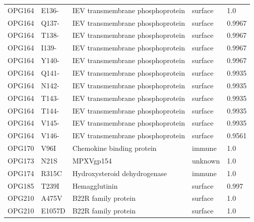 \documentclass[11pt]{article}
\begin{document}
\begin{longtable}{lllll}
OPG164 & E136- & IEV transmembrane phosphoprotein & surface & 1.0 \\
OPG164 & Q137- & IEV transmembrane phosphoprotein & surface & 0.9967 \\
OPG164 & T138- & IEV transmembrane phosphoprotein & surface & 0.9967 \\
OPG164 & I139- & IEV transmembrane phosphoprotein & surface & 0.9967 \\
OPG164 & Y140- & IEV transmembrane phosphoprotein & surface & 0.9967 \\
OPG164 & Q141- & IEV transmembrane phosphoprotein & surface & 0.9935 \\
OPG164 & N142- & IEV transmembrane phosphoprotein & surface & 0.9935 \\
OPG164 & T143- & IEV transmembrane phosphoprotein & surface & 0.9935 \\
OPG164 & T144- & IEV transmembrane phosphoprotein & surface & 0.9935 \\
OPG164 & V145- & IEV transmembrane phosphoprotein & surface & 0.9935 \\
OPG164 & V146- & IEV transmembrane phosphoprotein & surface & 0.9561 \\
OPG170 & V96I & Chemokine binding protein & immune & 1.0 \\
OPG173 & N21S & MPXVgp154 & unknown & 1.0 \\
OPG174 & R315C & Hydroxysteroid dehydrogenase & immune & 1.0 \\
OPG185 & T239I & Hemagglutinin & surface & 0.997 \\
OPG210 & A475V & B22R family protein & surface & 1.0 \\
OPG210 & E1057D & B22R family protein & surface & 1.0 \\
\hline
\end{longtable}

\clearpage
\appendix
\end{document}
